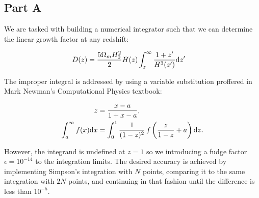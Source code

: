 \subsection{Part A}

We are tasked with building a numerical integrator such that we can determine the linear growth factor at any redshift:

\begin{align}
D(z) &= {5\Omega_{m} H_{0}^{2} \over 2} H(z) \int_{z}^{\infty} {1+z' \over H^{3}(z')} {\rm d} z'
\end{align}

The improper integral is addressed by using a variable substitution proffered in Mark Newman's Computational Physics textbook:

\begin{align}
z &= {x-a \over 1+x-a}, \\
\int_{a}^{\infty} f(x) {\rm d} x &= \int_{0}^{1} {1\over (1-z)^{2}} \, f\left({z \over 1-z} + a\right) {\rm d} z.
\end{align}

However, the integrand is undefined at $z = 1$ so we introducing a fudge factor $\epsilon = 10^{-14}$ to the integration limits. The desired accuracy is achieved by implementing Simpson's integration with $N$ points, comparing it to the same integration with $2N$ points, and continuing in that fashion until the difference is less than $10^{-5}$.




